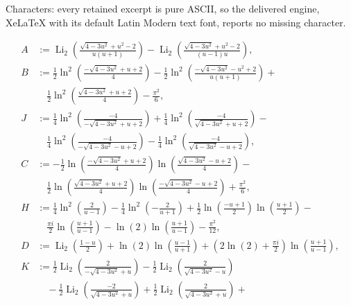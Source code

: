 \documentclass[10pt,a4paper]{amsart}
\begin{document}
Characters: every retained excerpt is pure ASCII, so the delivered engine, XeLaTeX with its default Latin Modern text font, reports no missing character.
\begin{theorem}\label{maintheorem}
  
\begin{align*}
 A & := \operatorname{Li}_2\left(\frac{\sqrt{4 - 3u^2} + u^2 - 2}{u (u + 1)}\right) 
 - \operatorname{Li}_2\left(\frac{\sqrt{4 - 3u^2} + u^2 - 2}{(u - 1) u}\right), \\ 
 B & := 
 \frac{1}{2} \ln^2\left(\frac{- \sqrt{4-3 u^2}+u+2}{4} \right) - 
 \frac{1}{2} \ln ^2\left(\frac{-  \sqrt{4-3 u^2 } - u^2 +2}{u 
 (u+1)}\right) + \\ 
 & \quad \frac{1}{2} \ln ^2\left(\frac{ \sqrt{4-3 u^2 } + u + 2}{4} \right)-\frac{\pi ^2}{6}, \\ 
 J & := \frac{1}{4} \ln^2 \left( \frac{-4}{- \sqrt{4-3 u^2 } + u + 2} \right) + 
 \frac{1}{4} \ln^2 \left( \frac{-4}{ \sqrt{4-3 u^2 } + u + 2} \right) - \\ 
 &\quad \frac{1}{4} \ln^2 \left( \frac{-4}{- \sqrt{4-3 u^2 } - u + 2} \right) - \frac{1}{4} 
 \ln^2 \left( \frac{-4}{ \sqrt{4-3 u^2 } - u + 2} \right), \\ 
 C & := - \frac{1}{2} \ln \left( \frac{ -  \sqrt{4-3 u^2} + u + 
 2}{4} \right) \ln \left( \frac{  \sqrt{4-3 u^2 } - u + 2}{4} \right) - \\ 
 & \quad \frac{1}{2} \ln \left( \frac{ \sqrt{4-3 u^2 } + u + 2}{4} \right) 
 \ln \left( \frac{-  \sqrt{4-3 u^2} - u + 2}{4} \right) + \frac{\pi^2}{6}, \\ 
 H & := 
 \frac{1}{4} \ln^2\left(\frac{2}{u-1}\right)-\frac{1}{4} \ln ^2\left(-\frac{2}{u+1}\right)+\frac{1}{2} \ln \left(\frac{-u + 1}{2} \right) 
 \ln \left(\frac{u+1}{2}\right) - \\ 
 & \quad \frac{\pi i}{2} \ln \left(\frac{u + 
 1}{u-1}\right)-\ln (2) \ln \left(\frac{u+1}{u-1}\right)-\frac{\pi^2}{12}, \\ 
 D & := \operatorname{Li}_2 \left( \frac{1 - u}{2} \right) 
 + \ln(2) \ln \left( \frac{u - 1}{u + 1} \right) + \left( 2 \ln(2) + \frac{\pi i}{2} \right) \ln \left( \frac{u + 
 1}{u - 1} \right), \\ 
 K & := \frac{1}{2} \operatorname{Li}_2 \left( \frac{2}{- \sqrt{4 - 3 u^2} + u} \right) - 
 \frac{1}{2} \operatorname{Li}_2 \left( \frac{2}{\sqrt{4 - 3 u^2} - u} \right) \\ 
 &\quad - \frac{1}{2} \operatorname{Li}_2 \left( \frac{-2}{\sqrt{4 - 3 u^2} + u} \right) + 
 \frac{1}{2} \operatorname{Li}_2 \left( \frac{2}{\sqrt{4 - 3 u^2} + u} \right) + 

\end{align*}
\end{theorem}
\end{document}
